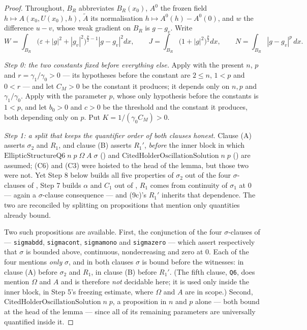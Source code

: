 \begin{proof}
Throughout, $B_R$ abbreviates $B_R(x_0)$, $A^0$ the frozen field
$h\mapsto A(x_0,U(x_0),h)$, $\widetilde A$ its normalisation
$h\mapsto A^0(h)-A^0(0)$, and $w$ the difference $u-v$, whose weak gradient on
$B_R$ is $g-g_v$.  Write
\[
W=\int_{B_R}\bigl(\varepsilon+|g|^2+|g_v|^2\bigr)^{\frac p2-1}|g-g_v|^2dx,
\qquad
J=\int_{B_R}\bigl(1+|g|^2\bigr)^{\frac p2}dx,
\qquad
N=\int_{B_R}|g-g_v|^p\,dx .
\]

\medskip
\noindent\emph{Step 0: the two constants fixed before everything else.}  Apply
 with the present $n$, $p$ and
$r=\gamma_1/\gamma_0>0$ --- its hypotheses before the constant are $2\le n$,
$1<p$ and $0<r$ --- and let $C_M>0$ be the constant it produces; it depends only
on $n,p$ and $\gamma_1/\gamma_0$.  Apply 
with the parameter $p$, whose only hypothesis before the constants is $1<p$, and
let $b_0>0$ and $c>0$ be the threshold and the constant it produces, both
depending only on $p$.  Put $K=1/(\gamma_0C_M)>0$.

\medskip
\noindent\emph{Step 1: a split that keeps the quantifier order of both clauses
honest.}  Clause (A) asserts $\sigma_2$ and $R_1$, and clause (B) asserts
$R_1'$, \emph{before} the inner block in which
$\mathrm{EllipticStructureQ6}\;n\;p\;\Omega\;A\;\sigma$
() and
$\mathrm{CitedHolderOscillationSolution}\;n\;p$
() are assumed; (C6) and (C3) were
hoisted to the head of the lemma, but those two were not.  Yet Step 8 below
builds all five properties of $\sigma_2$ out of the four $\sigma$-clauses of
, Step 7 builds $\alpha$ and $C_1$ out of
, $R_1$ comes from continuity of
$\sigma_1$ at $0$ --- again a $\sigma$-clause consequence --- and (9c)'s $R_1'$
inherits that dependence.  The two are reconciled by splitting on propositions
that mention only quantities already bound.

Two such propositions are available.  First, the conjunction of the four
$\sigma$-clauses of  --- \texttt{sigmabdd},
\texttt{sigmacont}, \texttt{sigmamono} and \texttt{sigmazero} --- which assert
respectively that $\sigma$ is bounded above, continuous, nondecreasing and zero
at $0$.  Each of the four mentions \emph{only} $\sigma$, and in both clauses
$\sigma$ is bound before the witnesses: in clause (A) before $\sigma_2$ and
$R_1$, in clause (B) before $R_1'$.  (The fifth clause, \texttt{Q6}, does
mention $\Omega$ and $A$ and is therefore \emph{not} decidable here; it is used
only inside the inner block, in Step 5's freezing estimate, where $\Omega$ and
$A$ are in scope.)  Second,
$\mathrm{CitedHolderOscillationSolution}\;n\;p$, a proposition in $n$ and $p$
alone --- both bound at the head of the lemma --- since all of its remaining
parameters are universally quantified inside it.


\end{proof}
